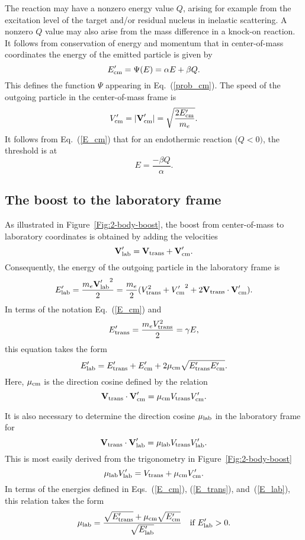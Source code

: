 The reaction may have a nonzero energy value $Q$, arising
for example from the excitation level of the target
and/or residual nucleus in inelastic scattering.  A nonzero
$Q$ value may also arise from the
mass difference in a knock-on reaction.  
It follows from conservation of energy and momentum that in
center-of-mass coordinates the energy of the emitted
particle is given by
\begin{equation}
  E_{\text{cm}}' = \Psi( E ) = \alpha E + \beta Q.
  \label{E_cm}
\end{equation}
This defines the function $\Psi$ appearing in Eq.~(\ref{prob_cm}).
The speed of the outgoing particle in the
center-of-mass frame is
\begin{equation}
  V_{\text{cm}}' = |\textbf{V}_{\text{cm}}'| = \sqrt{ \frac{ 2E_{\text{cm}}' }{m_e} }.
    \label{V-cm-outgoing}
\end{equation}
It follows from Eq.~(\ref{E_cm}) that for an endothermic
reaction ($Q < 0)$, the threshold is at
$$
  E = \frac{-\beta Q}{\alpha}.
$$ 

\subsection{The boost to the laboratory frame}
As illustrated in Figure~\ref{Fig:2-body-boost}, the boost from center-of-mass
to laboratory coordinates is obtained by adding the velocities
\begin{equation}
  \textbf{V}_{\text{lab}}' = \textbf{V}_{\text{trans}} + \textbf{V}_{\text{cm}}'.
 \label{V-lab-2-body}
\end{equation}
Consequently, the energy of the outgoing particle in the
laboratory frame is
$$
  E_{\text{lab}}' = \frac{ m_e {\textbf{V}_{\text{lab}}'}^2 }{2} =
        \frac{ m_e }{2}
        ( V_{\text{trans}}^2 + {V_{\text{cm}}'}^2 + 2\textbf{V}_{\text{trans}} \cdot \textbf{V}_{\text{cm}}' ).
$$
In terms of the notation Eq.~(\ref{E_cm}) and
\begin{equation}
  E_{\text{trans}}' = \frac{ m_e V_{\text{trans}}^2 }{2} =
  \gamma E,
  \label{E_trans}
\end{equation}
this equation takes the form
\begin{equation}
  E_{\text{lab}}' = E_{\text{trans}}' + E_{\text{cm}}' + 2 \mu_{\text{cm}} \sqrt{ E_{\text{trans}}' E_{\text{cm}}' }.
  \label{E_lab}
\end{equation}
Here, $\mu_{\text{cm}}$ is the direction cosine defined by the
relation
$$
   \textbf{V}_{\text{trans}} \cdot \textbf{V}_{\text{cm}}' = \mu_{\text{cm}} V_{\text{trans}} V_{\text{cm}}'.
$$
 
\begin{figure}

\end{figure}

It is also necessary to determine the direction cosine $\mu_{\text{lab}}$ in
the laboratory frame for
$$
     \textbf{V}_{\text{trans}} \cdot \textbf{V}_{\text{lab}}' = \mu_{\text{lab}} V_{\text{trans}} V_{\text{lab}}'.
$$
This is most easily derived from the trigonometry in Figure~\ref{Fig:2-body-boost}
$$
  \mu_{\text{lab}}  V_{\text{lab}}' = 
   V_{\text{trans}} + \mu_{\text{cm}} V_{\text{cm}}'.
$$
In terms of the energies defined in Eqs.~(\ref{E_cm}), (\ref{E_trans}),
and~(\ref{E_lab}), this relation takes the form
\begin{equation}
  \mu_{\text{lab}}  = \frac
   { \sqrt{ E_{\text{trans}}' } + \mu_{\text{cm}} \sqrt{ E_{\text{cm}}'} }
    {\sqrt{E_{\text{lab}}'}}
    \quad \text{if $E_{\text{lab}}' > 0$.}
  \label{get_mu}
\end{equation}

